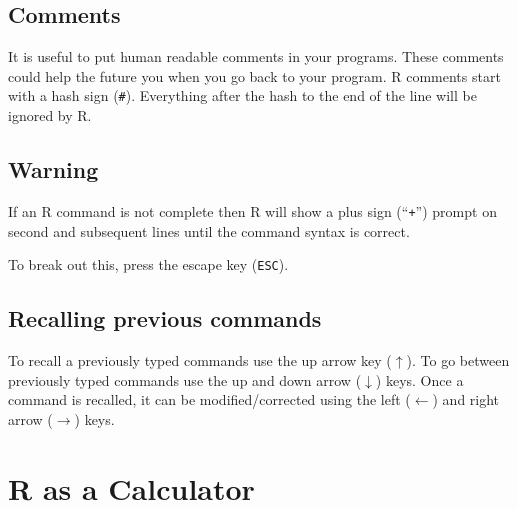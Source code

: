 \documentclass[letterpaperpaper,9pt,twocolumn,twoside,printwatermark=false]{pinp}
\begin{document}
\hypertarget{comments}{%
\subsection{Comments}\label{comments}}

It is useful to put human readable comments in your programs. These
comments could help the future you when you go back to your program. R
comments start with a hash sign (\texttt{\#}). Everything after the hash
to the end of the line will be ignored by R.

\begin{Shaded}
\begin{Highlighting}[]
\end{Highlighting}
\end{Shaded}

\hypertarget{warning}{%
\subsection{Warning}\label{warning}}

If an R command is not complete then R will show a plus sign
(``\texttt{+}'') prompt on second and subsequent lines until the command
syntax is correct.

\begin{Shaded}
\begin{Highlighting}[]
\OperatorTok{+}
\end{Highlighting}
\end{Shaded}

To break out this, press the escape key (\texttt{ESC}).

\hypertarget{recalling-previous-commands}{%
\subsection{Recalling previous
commands}\label{recalling-previous-commands}}

To recall a previously typed commands use the up arrow key
(\(\uparrow\)). To go between previously typed commands use the up and
down arrow (\(\downarrow\)) keys. Once a command is recalled, it can be
modified/corrected using the left (\(\leftarrow\)) and right arrow
(\(\rightarrow\)) keys.

\hypertarget{r-as-a-calculator}{%
\section{R as a Calculator}\label{r-as-a-calculator}}
\end{document}
